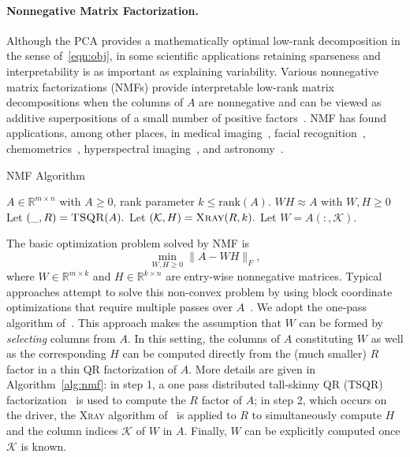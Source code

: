 \paragraph{Nonnegative Matrix Factorization.}
Although the PCA provides a mathematically optimal low-rank decomposition in the sense of~\eqref{eqn:obj}, in some scientific applications retaining sparseness and interpretability is as important as explaining variability. 
Various nonnegative matrix factorizations (NMFs) provide interpretable low-rank matrix decompositions when the columns of $A$ are nonnegative and can be viewed as additive superpositions of a small number of positive factors~\cite{gillis2014and}. NMF has found applications, among other places, in medical imaging~\cite{lee2001nmf}, facial recognition~\cite{guillamet2002non}, chemometrics~\cite{Paatero199723}, hyperspectral imaging~\cite{gillis2015hierarchical}, and astronomy~\cite{pauca2006nonnegative}.

\begin{algorithm}[tb]
    \caption{\textsc{NMF} Algorithm}
    \label{alg:nmf}
    \begin{algorithmic}[1]
      \Require $A \in \mathbb{R}^{m\times n}$ with $A \geq 0$, rank parameter $k \leq \textrm{rank}(A).$
      \Ensure $W H \approx A$ with $W,H \geq 0$
      \State Let $(\_, R) = \textsc{TSQR}(A).$
      \State Let $(\mathcal{K}, H) = \textsc{Xray}(R, k).$
      \State Let $W = A(:, \mathcal{K}).$
    \end{algorithmic}
  \end{algorithm}
  
The basic optimization problem solved by NMF is
\begin{equation}
\min_{W,H \geq 0} \|A - WH\|_F,
\end{equation}
where $W \in \mathbb{R}^{m \times k}$ and $H \in \mathbb{R}^{k \times n}$ are entry-wise nonnegative matrices. Typical approaches attempt to solve this non-convex problem by using block coordinate optimizations that require multiple passes over $A$~\cite{kim2014algorithms}. We adopt the one-pass algorithm of~\cite{benson2014scalable}. This approach makes the assumption that $W$ can be formed by {\it selecting} columns from $A$. In this setting, the columns of $A$ constituting $W$ as well as the corresponding $H$ can be computed directly from the (much smaller) $R$ factor in a thin QR factorization of $A$. More details are given in Algorithm~\ref{alg:nmf}: in step 1, a one pass distributed tall-skinny QR (\textsc{TSQR}) factorization~\cite{demmel12} is used to compute the $R$ factor of $A$; in step 2, which occurs on the driver, the \textsc{Xray} algorithm of~\cite{kumar13} is applied to $R$ to simultaneously compute $H$ and the column indices $\mathcal{K}$ of $W$ in $A$. Finally, $W$ can be explicitly computed once $\mathcal{K}$ is known.

